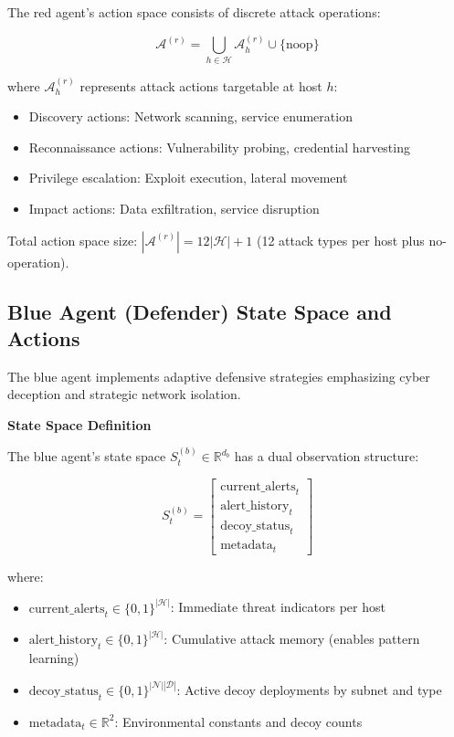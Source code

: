 \documentclass[12pt,oneside]{article}
\begin{document}
The red agent's action space consists of discrete attack operations:

\begin{equation}
\mathcal{A}^{(r)} = \bigcup_{h \in \mathcal{H}} \mathcal{A}^{(r)}_h \cup \{\text{noop}\}
\end{equation}

where $\mathcal{A}^{(r)}_h$ represents attack actions targetable at host $h$:
\begin{itemize}
    \item Discovery actions: Network scanning, service enumeration
    \item Reconnaissance actions: Vulnerability probing, credential harvesting  
    \item Privilege escalation: Exploit execution, lateral movement
    \item Impact actions: Data exfiltration, service disruption
\end{itemize}

Total action space size: $|\mathcal{A}^{(r)}| = 12|\mathcal{H}| + 1$ (12 attack types per host plus no-operation).

\subsection{Blue Agent (Defender) State Space and Actions}

The blue agent implements adaptive defensive strategies emphasizing cyber deception and strategic network isolation.

\textbf{State Space Definition}

The blue agent's state space $S^{(b)}_t \in \mathbb{R}^{d_b}$ has a dual observation structure:

\begin{equation}
S^{(b)}_t = \begin{bmatrix}
\text{current\_alerts}_t \\
\text{alert\_history}_t \\
\text{decoy\_status}_t \\
\text{metadata}_t
\end{bmatrix}
\end{equation}

where:
\begin{itemize}
    \item $\text{current\_alerts}_t \in \{0,1\}^{|\mathcal{H}|}$: Immediate threat indicators per host
    \item $\text{alert\_history}_t \in \{0,1\}^{|\mathcal{H}|}$: Cumulative attack memory (enables pattern learning)
    \item $\text{decoy\_status}_t \in \{0,1\}^{|\mathcal{N}||\mathcal{D}|}$: Active decoy deployments by subnet and type
    \item $\text{metadata}_t \in \mathbb{R}^2$: Environmental constants and decoy counts
\end{itemize}
\end{document}

